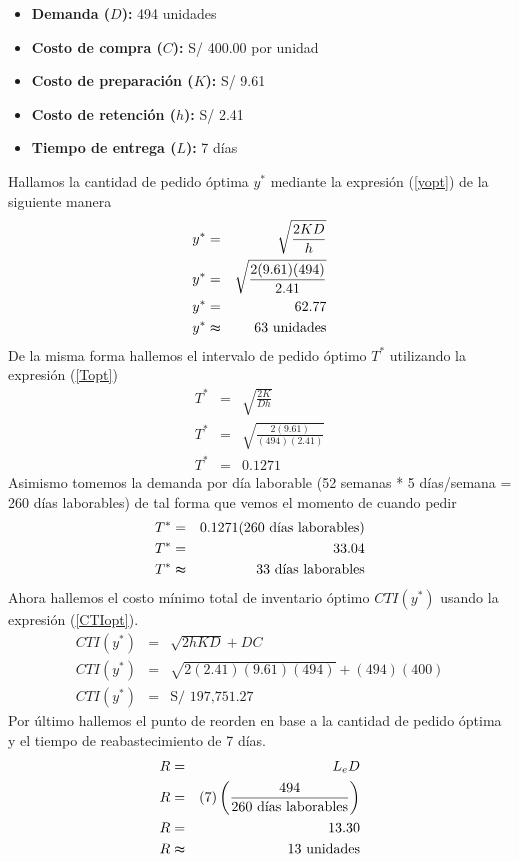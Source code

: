 \begin{itemize}
    \item \textbf{Demanda ($D$):} 494 unidades
    \item \textbf{Costo de compra ($C$):} S/ 400.00 por unidad
    \item \textbf{Costo de preparación ($K$):} S/ 9.61
    \item \textbf{Costo de retención ($h$):} S/ 2.41
    \item \textbf{Tiempo de entrega ($L$):} 7 días
\end{itemize}

Hallamos la cantidad de pedido óptima $y^*$ mediante la expresión (\ref{yopt}) de la siguiente manera
\begin{eqnarray}
    y^* &=& \sqrt{\frac{2KD}{h}} \nonumber \\
    y^* &=& \sqrt{\frac{2(9.61)(494)}{2.41}} \nonumber \\
    y^* &=& 62.77 \nonumber \\
    y^* &\thickapprox& 63 \text{ unidades} \nonumber
\end{eqnarray}
De la misma forma hallemos el intervalo de pedido óptimo $T^*$ utilizando la expresión (\ref{Topt}) 
\begin{eqnarray}
    T^* &=& \sqrt{\frac{2K}{Dh}} \nonumber \\
    T^* &=& \sqrt{\frac{2(9.61)}{(494)(2.41)}} \nonumber \\
    T^* &=& 0.1271 \nonumber
\end{eqnarray}
\clearpage
\noindent Asimismo tomemos la demanda por día laborable (52 semanas * 5 días/semana = 260 días laborables) de tal forma que vemos el momento de cuando pedir
\begin{eqnarray}
    T^* &=& 0.1271 (260 \text{ días laborables}) \nonumber \\   
    T^* &=& 33.04 \nonumber \\
    T^* &\thickapprox& 33 \text{ días laborables} \nonumber
\end{eqnarray}
Ahora hallemos el costo mínimo total de inventario óptimo $CTI(y^*)$ usando la expresión (\ref{CTIopt}).
\begin{eqnarray}
    CTI(y^*) &=& \sqrt{2hKD} + DC \nonumber \\
    CTI(y^*) &=& \sqrt{2(2.41)(9.61)(494)} + (494)(400) \nonumber \\
    CTI(y^*) &=& \text{S/ 197,751.27} \nonumber
\end{eqnarray}
Por último hallemos el punto de reorden en base a la cantidad de pedido óptima y el tiempo de reabastecimiento de 7 días.
\begin{eqnarray}
    R &=& L_e D \nonumber \\
    R &=& (7) \left(\frac{494}{260 \text{ días laborables}} \right) \nonumber \\
    R &=& 13.30 \nonumber \\
    R &\thickapprox& 13 \text{ unidades} \nonumber
\end{eqnarray}

